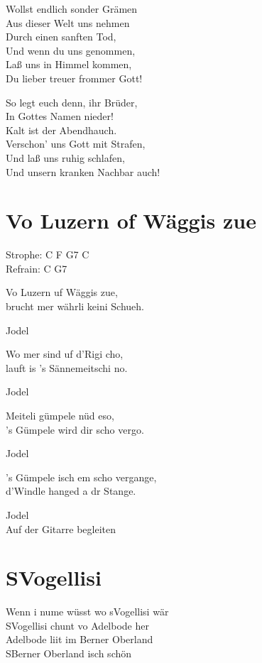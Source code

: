\documentclass[
  letterpaper,
  twoside=false]{scrbook}
\begin{document}
Wollst endlich sonder Grämen\\
Aus dieser Welt uns nehmen\\
Durch einen sanften Tod,\\
Und wenn du uns genommen,\\
Laß uns in Himmel kommen,\\
Du lieber treuer frommer Gott!

So legt euch denn, ihr Brüder,\\
In Gottes Namen nieder!\\
Kalt ist der Abendhauch.\\
Verschon' uns Gott mit Strafen,\\
Und laß uns ruhig schlafen,\\
Und unsern kranken Nachbar auch!

\hypertarget{vo-luzern-of-wuxe4ggis-zue}{%
\chapter{Vo Luzern of Wäggis zue}\label{vo-luzern-of-wuxe4ggis-zue}}

Strophe: C F G7 C\\
Refrain: C G7

Vo Luzern uf Wäggis zue,\\
brucht mer währli keini Schueh.

Jodel

Wo mer sind uf d'Rigi cho,\\
lauft is 's Sännemeitschi no.

Jodel

Meiteli gümpele nüd eso,\\
's Gümpele wird dir scho vergo.

Jodel

's Gümpele isch em scho vergange,\\
d'Windle hanged a dr Stange.

Jodel\\
Auf der Gitarre begleiten

\hypertarget{svogellisi}{%
\chapter{S\textquotesingle Vogellisi}\label{svogellisi}}

Wenn i nume wüsst wo s\textquotesingle Vogellisi wär\\
S\textquotesingle Vogellisi chunt vo Adelbode her\\
Adelbode liit im Berner Oberland\\
S\textquotesingle Berner Oberland isch schön
\end{document}
